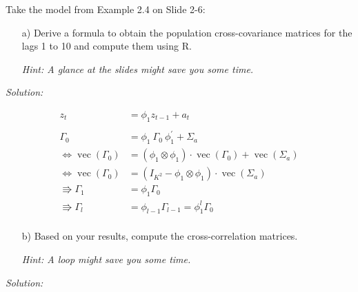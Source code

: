 \documentclass[12pt,a4paper]{article}
\renewcommand{\vec}{\operatorname{vec}}
\begin{document}
Take the model from Example 2.4 on Slide 2-6:

\begin{itemize}
  \item[a)] Derive a formula to obtain the population cross-covariance matrices for the lags 1 to 10 and compute them using R.
  \item[] \textit{Hint: A glance at the slides might save you some time.}
\end{itemize}

\emph{Solution:}

\begin{align*}
  z_t & = \phi_1 z_{t-1} + a_t\\
  \\
  \Gamma_0 & = \phi_1  \ \Gamma_0 \ \phi_1^{'} + \Sigma_a\\
  \Leftrightarrow \vec(\Gamma_0) &= (\phi_1 \otimes \phi_1) \cdot \vec(\Gamma_0) + \vec(\Sigma_a) \\
  \Leftrightarrow \vec(\Gamma_0) &= (I_{K^2} - \phi_1 \otimes \phi_1) \cdot \vec(\Sigma_a) \\
 \Rrightarrow \Gamma_1 & = \phi_1 \Gamma_0\\
 \Rrightarrow \Gamma_l & = \phi_{l-1} \Gamma_{l-1} = \phi_1^{l} \Gamma_0\\
\end{align*}

\begin{itemize}
  \item[b)] Based on your results, compute the cross-correlation matrices.
  \item[] \textit{Hint: A loop might save you some time.}
\end{itemize}

\emph{Solution:}
\end{document}
